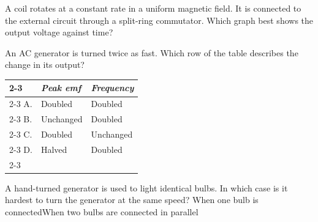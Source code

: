 \begin{quizq}{}
A coil rotates at a constant rate in a uniform magnetic field. It is connected to the external
circuit through a split-ring commutator. Which graph best shows the output voltage against time?
  {%
  }
  {%
  }
  {%
  }
\end{quizq}

\begin{quizq}{}
An AC generator is turned twice as fast. Which row of the table describes the change in its output?
\begin{center}
  \renewcommand\arraystretch{1.7}
  \begin{tabular}{@{}p{10mm}|>{\centering\arraybackslash}p{50mm}|>{\centering\arraybackslash}p{50mm}|}
    \cline{2-3}
    & \textit{Peak emf} & \textit{Frequency}\\ \cline{2-3}
    A. & Doubled & Doubled\\ \cline{2-3}
    B. & Unchanged & Doubled\\ \cline{2-3}
    C. & Doubled & Unchanged\\ \cline{2-3}
    D. & Halved & Doubled\\ \cline{2-3}
  \end{tabular}
\end{center}
\end{quizq}

\begin{quizq}{}
A hand-turned generator is used to light identical bulbs. In which case is it hardest to turn the
generator at the same speed?
  {When one bulb is connected}{When two bulbs are connected in parallel}
\end{quizq}

